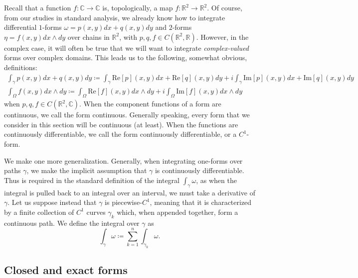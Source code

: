 \documentclass[aps,pra,showpacs,notitlepage,onecolumn,superscriptaddress,nofootinbib]{revtex4-1}
\theoremstyle{definition}
\begin{document}
\noindent Recall that a function $f : \mathbb{C} \rightarrow \mathbb{C}$ is, topologically, a map $f : \mathbb{R}^2 \rightarrow \mathbb{R}^2$. Of course, from our studies in standard analysis,
we already know how to integrate differential $1$-forms $\omega = p(x, y) dx + q(x, y) dy$ and $2$-forms $\eta = f(x, y) dx \wedge dy$ over chains in $\mathbb{R}^2$, with $p, q, f \in C(\mathbb{R}^2, \mathbb{R})$.
However, in the complex case, it will often be true that we will want to integrate \emph{complex-valued} forms over complex domains. This leads us to the following, somewhat obvious, definitions:
\begin{align}
  \displaystyle\int_{\gamma} p(x, y) dx + q(x, y) dy \coloneqq \displaystyle\int_{\gamma} \text{Re}[p](x, y) dx + \text{Re}[q](x, y) dy + i \displaystyle\int_{\gamma} \text{Im}[p](x, y) dx + \text{Im}[q](x, y) dy \\
  \displaystyle\int_{\Omega} f(x, y) dx \wedge dy \coloneqq  \displaystyle\int_{\Omega} \text{Re}[f](x, y) dx \wedge dy + i \displaystyle\int_{\Omega} \text{Im}[f](x, y) dx \wedge dy
\end{align}
when $p, q, f \in C(\mathbb{R}^2, \mathbb{C})$. When the component functions of a form are continuous, we call the form continuous. Generally speaking, every form that we consider in this section
will be continuous (at least). When the functions are continuously differentiable, we call
the form continuously differentiable, or a $C^1$-form.
\newline

\noindent We make one more generalization. Generally, when integrating one-forms over paths $\gamma$, we make the implicit assumption that $\gamma$ is continuously differentiable. Thus is required in the standard
definition of the integral $\int_{\gamma} \omega$, as when the integral is pulled back to an integral over an interval, we must take a derivative of $\gamma$. Let us suppose instead that $\gamma$ is piecewise-$C^1$,
meaning that it is characterized by a finite collection of $C^1$ curves $\gamma_k$ which, when appended together, form a continuous path. We define the integral over $\gamma$ as
\begin{equation}
  \displaystyle\int_{\gamma} \omega \coloneqq \displaystyle\sum_{k = 1}^{n} \displaystyle\int_{\gamma_k} \omega.
\end{equation}


\subsection{Closed and exact forms}
\end{document}
